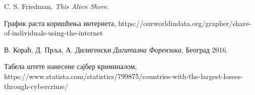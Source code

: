 \documentclass[a4paper]{article}
\begin{document}
\newpage
    \appendix

     
    

    \begin{thebibliography}{9}

    C. S. Friedman, \emph{This Alien Shore}.

    График раста коришћења интернета, https://ourworldindata.org/grapher/share-of-individuals-using-the-internet

    В. Кораћ, Д. Прља, А. Дилигенски \emph{Дигитална Форензика}, Београд 2016.

    Табела штете нанесене сајбер криминалом, https://www.statista.com/statistics/799875/countries-with-the-largest-losses-through-cybercrime/

    \end{thebibliography}

    \appendix
\end{document}

